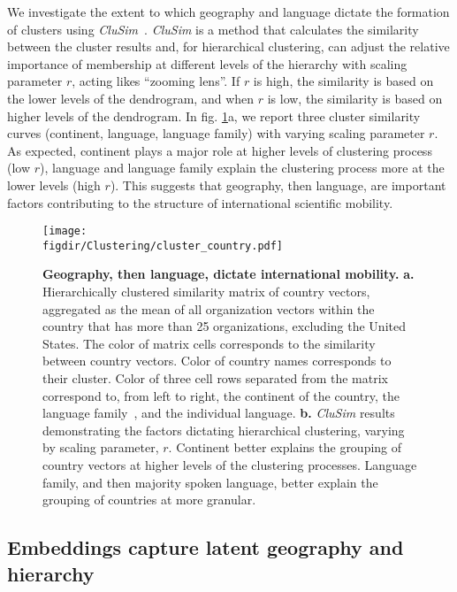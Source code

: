 \documentclass[12pt]{article} %
\def\figdir{../Figs}
\begin{document}
We investigate the extent to which geography and language dictate the formation of clusters using \textit{CluSim}~\autocite{gates2019element}.
\textit{CluSim} is a method that calculates the similarity between the cluster results and, for hierarchical clustering, can adjust the relative importance of membership at different levels of the hierarchy with scaling parameter $r$, acting likes ``zooming lens''.
If $r$ is high, the similarity is based on the lower levels of the dendrogram, and when $r$ is low, the similarity is based on higher levels of the dendrogram.
In fig. \ref{fig:clustering}a, we report three cluster similarity curves (continent, language, language family) with varying scaling parameter $r$.
As expected, continent plays a major role at higher levels of clustering process (low $r$), language and language family explain the clustering process more at the lower levels (high $r$).
This suggests that geography, then language, are important factors contributing to the structure of international scientific mobility.

%
%
\begin{figure}[p!]
    \centering
    \label{fig:clustering}
    \texttt{[image: \\figdir/Clustering/cluster\_country.pdf]}
    \caption{
        \textbf{Geography, then language, dictate international mobility.}
        \textbf{a.} Hierarchically clustered similarity matrix of country vectors, aggregated as the mean of all organization vectors within the country that has more than 25 organizations, excluding the United States.
        The color of matrix cells corresponds to the similarity between country vectors.
        Color of country names corresponds to their cluster.
        Color of three cell rows separated from the matrix correspond to, from left to right, the continent of the country, the language family~\autocite{ethnologue}, and the individual language.
        \textbf{b.}    \textit{CluSim} \autocite{gates2019element} results demonstrating the factors dictating hierarchical clustering, varying by scaling parameter, $r$.
        Continent better explains the grouping of country vectors at higher levels of the clustering processes.
        Language family, and then majority spoken language, better explain the grouping of countries at more granular.
    }
\end{figure}


%
%
\subsection*{Embeddings capture latent geography and hierarchy}
\end{document}
